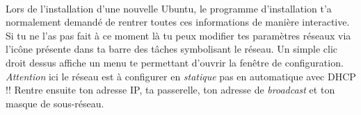 \paragraph{}
\label{Ubuntu:IP}

Lors de l'installation d'une nouvelle Ubuntu, le programme d'installation t'a normalement demandé de rentrer toutes ces informations de manière
interactive. Si tu ne l'as pas fait à ce moment là tu peux modifier tes paramètres réseaux via l'icône présente dans ta barre des tâches symbolisant
le réseau. Un simple clic droit dessus affiche un menu te permettant d'ouvrir la fenêtre de configuration. \emph{Attention} ici le réseau est à configurer en
\emph{statique} pas en automatique avec DHCP !! Rentre ensuite ton adresse IP, ta passerelle, ton adresse de \emph{broadcast} et ton masque de sous-réseau.

